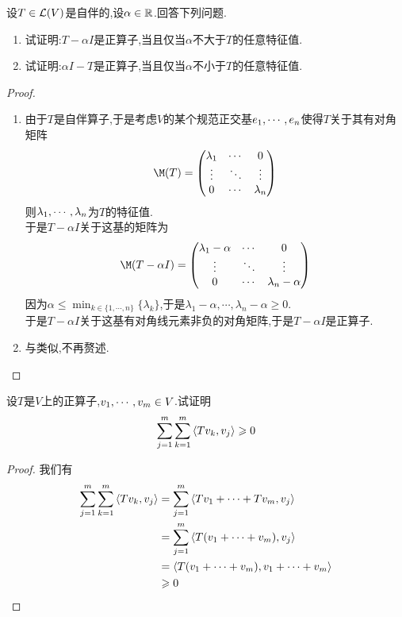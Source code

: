 \documentclass{ctexart}
\begin{document}
\begin{problem}[13.]
    设$T\in\mathcal{L}(V)$是自伴的,设$\alpha\in\mathbb{R}$.回答下列问题.
    \begin{enumerate}[label=\tbf{(\arabic*)}]
        \item 试证明:$T-\alpha I$是正算子,当且仅当$\alpha$不大于$T$的任意特征值.
        \item 试证明:$\alpha I-T$是正算子,当且仅当$\alpha$不小于$T$的任意特征值.
    \end{enumerate}
\end{problem}
\begin{proof}
    \begin{enumerate}[label=\tbf{(\arabic*)}]
        \item 由于$T$是自伴算子,于是考虑$V$的某个规范正交基${e}_1,\cdots,{e}_{n}$使得$T$关于其有对角矩阵
            \[\M(T)=\begin{pmatrix}
                \lambda_1&\cdots&0\\
                \vdots&\ddots&\vdots\\
                0&\cdots&\lambda_n
            \end{pmatrix}\]
            则${\lambda}_1,\cdots,{\lambda}_{n}$为$T$的特征值.\\
            于是$T-\alpha I$关于这基的矩阵为
            \[\M(T-\alpha I)=\begin{pmatrix}
                \lambda_1-\alpha&\cdots&0\\
                \vdots&\ddots&\vdots\\
                0&\cdots&\lambda_n-\alpha
            \end{pmatrix}\]
            因为$\alpha\leqslant\displaystyle\min_{k\in\{1,\cdots,n\}}\{\lambda_k\}$,于是$\lambda_1-\alpha,\cdots,\lambda_n-\alpha\geqslant0$.\\
            于是$T-\alpha I$关于这基有对角线元素非负的对角矩阵,于是$T-\alpha I$是正算子.
        \item 与类似,不再赘述.
    \end{enumerate}
\end{proof}
\begin{problem}[14.]
    设$T$是$V$上的正算子,${v}_1,\cdots,{v}_{m}\in V$.试证明
    \[\sum_{j=1}^{m}\sum_{k=1}^{m}\left\langle{Tv_k},{v_j}\right\rangle\geqslant0\]
\end{problem}
\begin{proof}
    我们有
    \[\begin{aligned}
        \sum_{j=1}^{m}\sum_{k=1}^{m}\left\langle{Tv_k},{v_j}\right\rangle
        &= \sum_{j=1}^{m}\left\langle{Tv_1+\cdots+Tv_m},{v_j}\right\rangle \\
        &= \sum_{j=1}^{m}\left\langle{T({v}_1+\cdots+{v}_{m})},{v_j}\right\rangle \\
        &= \left\langle{T({v}_1+\cdots+{v}_{m})},{{v}_1+\cdots+{v}_{m}}\right\rangle \\
        &\geqslant0
    \end{aligned}\]
\end{proof}
\end{document}
